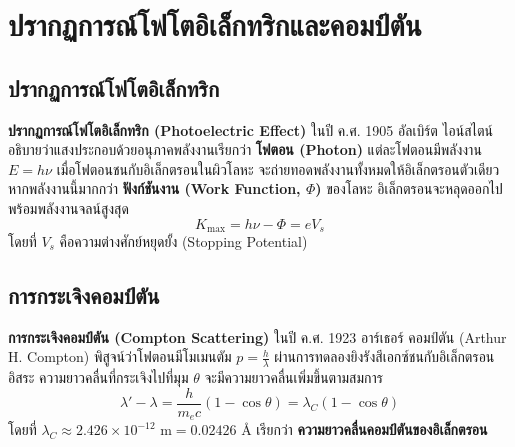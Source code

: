 \section{ปรากฏการณ์โฟโตอิเล็กทริกและคอมป์ตัน}

\subsection{ปรากฏการณ์โฟโตอิเล็กทริก}
\textbf{ปรากฏการณ์โฟโตอิเล็กทริก (Photoelectric Effect)} ในปี ค.ศ. 1905 อัลเบิร์ต ไอน์สไตน์ อธิบายว่าแสงประกอบด้วยอนุภาคพลังงานเรียกว่า \textbf{โฟตอน (Photon)} แต่ละโฟตอนมีพลังงาน $E = h\nu$ เมื่อโฟตอนชนกับอิเล็กตรอนในผิวโลหะ จะถ่ายทอดพลังงานทั้งหมดให้อิเล็กตรอนตัวเดียว หากพลังงานนี้มากกว่า \textbf{ฟังก์ชันงาน (Work Function, $\Phi$)} ของโลหะ อิเล็กตรอนจะหลุดออกไปพร้อมพลังงานจลน์สูงสุด
\begin{equation}
K_{\max} = h\nu - \Phi = e V_s
\end{equation}
โดยที่ $V_s$ คือความต่างศักย์หยุดยั้ง (Stopping Potential)

\subsection{การกระเจิงคอมป์ตัน}
\textbf{การกระเจิงคอมป์ตัน (Compton Scattering)} ในปี ค.ศ. 1923 อาร์เธอร์ คอมป์ตัน (Arthur H. Compton) พิสูจน์ว่าโฟตอนมีโมเมนตัม $p = \frac{h}{\lambda}$ ผ่านการทดลองยิงรังสีเอกซ์ชนกับอิเล็กตรอนอิสระ ความยาวคลื่นที่กระเจิงไปที่มุม $\theta$ จะมีความยาวคลื่นเพิ่มขึ้นตามสมการ
\begin{equation}
\lambda' - \lambda = \frac{h}{m_e c} (1 - \cos\theta) = \lambda_C (1 - \cos\theta)
\end{equation}
โดยที่ $\lambda_C \approx 2.426 \times 10^{-12}\text{ m} = 0.02426\text{ \AA}$ เรียกว่า \textbf{ความยาวคลื่นคอมป์ตันของอิเล็กตรอน}

